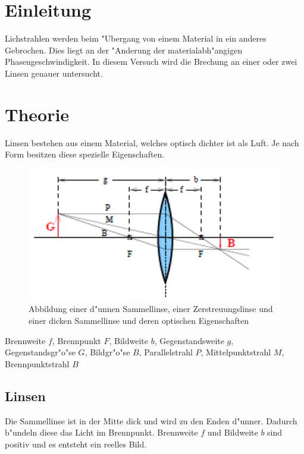 \section{Einleitung}
	\label{sec:einleitung}
	
	Lichstrahlen werden beim "Ubergang von einem Material in ein anderes Gebrochen.
	Dies liegt an der "Anderung der materialabh"angigen Phasengeschwindigkeit.
	In diesem Versuch wird die Brechung an einer oder zwei Linsen genauer untersucht.

\section{Theorie}
	\label{sec:theorie}

	Linsen bestehen aus einem Material, welches optisch dichter ist als Luft.
	Je nach Form besitzen diese spezielle Eigenschaften.
	
	\begin{figure}[htbp]
		\centering
		\includegraphics[width = 12cm]{img/sammellinse.PNG}
		\caption{Abbildung einer d"unnen Sammellinse, einer Zerstreuungslinse und einer dicken Sammellinse und deren optischen Eigenschaften \cite{anleitung}}
		\label{sammellinse}
	\end{figure}

	\begin{center}
			\tiny{Brennweite $f$, Brennpunkt $F$, Bildweite $b$, Gegenstandsweite $g$, Gegenstandsgr"o"se $G$, Bildgr"o"se $B$, Parallelstrahl $P$, Mittelpunktstrahl $M$, Brennpunktstrahl $B$}
	\end{center}

	\subsection{Linsen} %
	\label{sub:sammellinse}
	
	Die Sammellinse ist in der Mitte dick und wird zu den Enden d"unner. Dadurch b"undeln diese das Licht im Brennpunkt.
	Brennweite $f$ und Bildweite $b$ sind positiv und es entsteht ein reelles Bild.

